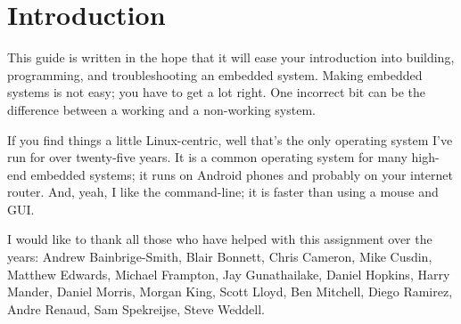 \chapter{Introduction}

This guide is written in the hope that it will ease your introduction
into building, programming, and troubleshooting an embedded system.
Making embedded systems is not easy; you have to get a lot right.  One
incorrect bit can be the difference between a working and a
non-working system.

If you find things a little Linux-centric, well that's the only
operating system I've run for over twenty-five years.  It is a common
operating system for many high-end embedded systems; it runs on
Android phones and probably on your internet router.  And, yeah, I
like the command-line; it is faster than using a mouse and GUI.


I would like to thank all those who have helped with this assignment
over the years: Andrew Bainbrige-Smith, Blair Bonnett, Chris Cameron,
Mike Cusdin, Matthew Edwards, Michael Frampton, Jay Gunathailake,
Daniel Hopkins, Harry Mander, Daniel Morris, Morgan King, Scott Lloyd,
Ben Mitchell, Diego Ramirez, Andre Renaud, Sam Spekreijse, Steve
Weddell.
